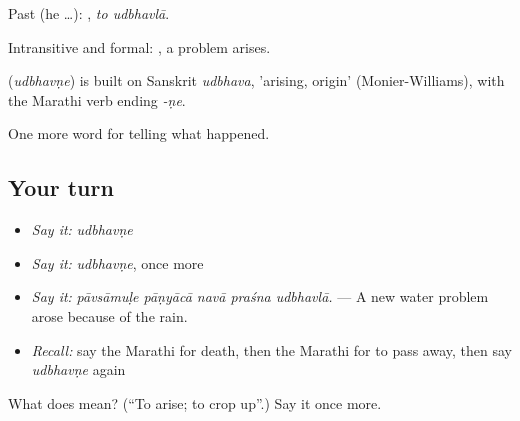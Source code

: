 Past (he …):  , \emph{to udbhavlā}.

Intransitive and formal:  , a problem arises.

\begin{cousinweb}
\textbf{} (\emph{udbhavṇe}) is built on Sanskrit \emph{udbhava}, 'arising, origin' (Monier-Williams), with the Marathi verb ending \emph{-ṇe}.
\end{cousinweb}

\begin{grammarlens}[title={What you've built}]
One more word for telling what happened.
\end{grammarlens}

\subsection*{Your turn}
\begin{itemize}
\raggedright
  \item \emph{Say it:} \emph{udbhavṇe}
  \item \emph{Say it:} \emph{udbhavṇe}, once more
  \item \emph{Say it:} \emph{pāvsāmuḷe pāṇyācā navā praśna udbhavlā.} — A new water problem arose because of the rain.
  \item \emph{Recall:} say the Marathi for death, then the Marathi for to pass away, then say \emph{udbhavṇe} again
\end{itemize}

\begin{tcolorbox}[breakable,colback=teal!4,colframe=teal!35!black,title={Before you move on}]
What does  mean? (\textquotedblleft{}To arise; to crop up\textquotedblright{}.) Say it once more.
\end{tcolorbox}
